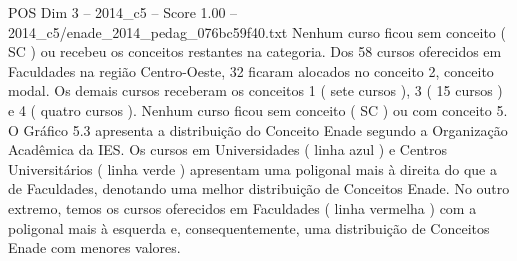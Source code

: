\begin{textsample}{POS Dim 3 – 2014\_c5 – Score 1.00 – 2014\_c5/enade\_2014\_pedag\_076bc59f40.txt}
Nenhum curso ficou sem conceito ( SC ) ou recebeu os conceitos restantes na categoria.
Dos 58 cursos oferecidos em Faculdades na região Centro-Oeste, 32 ficaram alocados no conceito 2, conceito modal.
Os demais cursos receberam os conceitos 1 ( sete cursos ), 3 ( 15 cursos ) e 4 ( quatro cursos ).
Nenhum curso ficou sem conceito ( SC ) ou com conceito 5.
O Gráfico 5.3 apresenta a distribuição do Conceito Enade segundo a Organização Acadêmica da IES.
Os cursos em Universidades ( linha azul ) e Centros Universitários ( linha verde ) apresentam uma poligonal mais à direita do que a de Faculdades, denotando uma melhor distribuição de Conceitos Enade.
No outro extremo, temos os cursos oferecidos em Faculdades ( linha vermelha ) com a poligonal mais à esquerda e, consequentemente, uma distribuição de Conceitos Enade com menores valores.

\end{textsample}
